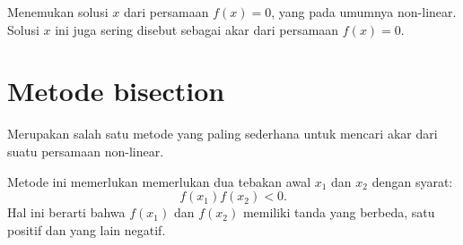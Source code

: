 \documentclass[a4paper]{article}
\begin{document}
Menemukan solusi $x$ dari persamaan $f(x) = 0$, yang pada umumnya non-linear.
Solusi $x$ ini juga sering disebut sebagai akar dari persamaan $f(x) = 0$.

\section{Metode bisection}

Merupakan salah satu metode yang paling sederhana untuk mencari akar
dari suatu persamaan non-linear.

Metode ini memerlukan memerlukan dua tebakan awal $x_{1}$ dan $x_{2}$
dengan syarat:
\begin{equation}
f(x_1)f(x_2) < 0.
\end{equation}
Hal ini berarti bahwa $f(x_1)$ dan $f(x_2)$ memiliki tanda yang berbeda, satu positif
dan yang lain negatif.
\end{document}
